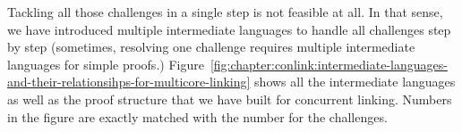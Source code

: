 Tackling all those challenges in a single step is not feasible at all. 
In that sense, 
we have introduced multiple intermediate languages 
to handle all challenges step by step (sometimes,
resolving one challenge requires multiple intermediate languages
for simple proofs.) 
Figure~\ref{fig:chapter:conlink:intermediate-languages-and-their-relationsihps-for-multicore-linking} shows
all the intermediate languages as well as the proof structure that we have built for concurrent linking. 
Numbers in the figure are exactly matched with the number for the challenges. 




%
%
%
%
